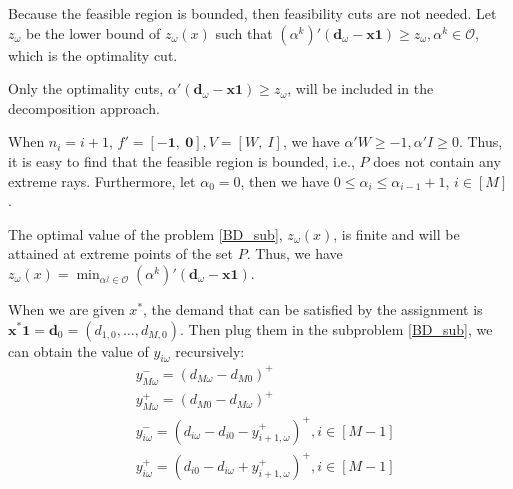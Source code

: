 Because the feasible region is bounded, then feasibility cuts are not needed. Let $z_{\omega}$ be the lower bound of $z_{\omega}(x)$ such that $(\alpha^{k}){'}(\mathbf{d}_{\omega}- \mathbf{x} \mathbf{1}) \geq z_{\omega}, \alpha^k \in \mathcal{O}$, which is the optimality cut.

\begin{corollary}
  Only the optimality cuts, $\alpha{'}(\mathbf{d}_{\omega}- \mathbf{x} \mathbf{1}) \geq z_{\omega}$, will be included in the decomposition approach.
\end{corollary}


\begin{corollary}
  When $n_i = i+1$, $f{'} = [-\mathbf{1},~\mathbf{0}], V =[W,~I]$, we have $\alpha{'}W \geq -1, \alpha{'}I \geq 0$. Thus, it is easy to find that the feasible region is bounded, i.e., $P$ does not contain any extreme rays. Furthermore, let $\alpha_0 = 0$, then we have $0 \leq \alpha_i \leq \alpha_{i-1} +1$, $i \in [M]$.

\end{corollary}

\begin{corollary}
The optimal value of the problem \eqref{BD_sub}, $z_{\omega}(x)$, is finite and will be attained at extreme points of the set $P$. Thus, we have $z_{\omega}(x) = \min_{\alpha^j \in \mathcal{O}} (\alpha^{k}){'}(\mathbf{d}_{\omega}- \mathbf{x} \mathbf{1})$. 
\end{corollary}


When we are given $x^{*}$, the demand that can be satisfied by the assignment is $\mathbf{x}^{*} \mathbf{1} = \mathbf{d}_0 = (d_{1,0},\ldots,d_{M,0})$.
Then plug them in the subproblem \eqref{BD_sub}, we can obtain the value of $y_{i \omega}$ recursively:
\begin{equation}\label{y_recursively}
\begin{aligned}
  & y_{M \omega}^{-}=\left(d_{M \omega}-d_{M 0}\right)^{+} \\
  & y_{M \omega}^{+}=\left(d_{M 0}-d_{M \omega}\right)^{+} \\
  & y_{i \omega}^{-}=\left(d_{i \omega}-d_{i 0} - y_{i+1, \omega}^{+} \right)^{+}, i \in [M-1] \\
  & y_{i \omega}^{+}=\left(d_{i 0}- d_{i \omega} + y_{i+1, \omega}^{+}\right)^{+}, i \in [M-1]
\end{aligned}
\end{equation}

